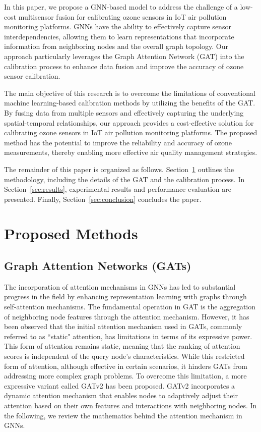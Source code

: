 \documentclass[conference,a4paper]{IEEEtran}
\begin{document}
In this paper, we propose a GNN-based model to address the challenge of a low-cost multisensor fusion for calibrating ozone sensors in IoT air pollution monitoring platforms. GNNs have the ability to effectively capture sensor interdependencies, allowing them to learn representations that incorporate information from neighboring nodes and the overall graph topology. Our approach particularly leverages the Graph Attention Network (GAT)\cite{veličković2018graph} into the calibration process to enhance data fusion and improve the accuracy of ozone sensor calibration.

The main objective of this research is to overcome the limitations of conventional machine learning-based calibration methods by utilizing the benefits of the GAT. By fusing data from multiple sensors and effectively capturing the underlying spatial-temporal relationships, our approach provides  a cost-effective solution for calibrating ozone sensors in IoT air pollution monitoring platforms. The proposed method has the potential to improve the reliability and accuracy of ozone measurements, thereby enabling more effective air quality management strategies.

The remainder of this paper is organized as follows. Section~\ref{sec:method} outlines the methodology, including the details of the GAT and the calibration process. In Section~\ref{sec:results}, experimental results and performance evaluation are presented. Finally, Section~\ref{sec:conclusion} concludes the paper.

\section{Proposed Methods}
\label{sec:method}

\subsection{Graph Attention Networks (GATs)}
The incorporation of attention mechanisms in GNNs has led to substantial progress in the field by enhancing representation learning with graphs through self-attention mechanisms. The fundamental operation in GAT is the aggregation of neighboring node features through the attention mechanism\cite{veličković2018graph}. However, it has been observed that the initial attention mechanism used in GATs, commonly referred to as ``static" attention, has limitations in terms of its expressive power. This form of attention remains static,  meaning that the ranking of attention scores is independent of the query node's characteristics. While this restricted form of attention, although effective in certain scenarios, it hinders GATs from addressing more complex graph problems. To overcome this limitation, a more expressive variant called GATv2 has been proposed\cite{brody2022how}. GATv2 incorporates a dynamic attention mechanism that enables nodes to adaptively adjust their attention based on their own features and interactions with neighboring nodes. In the following, we review the mathematics behind the attention mechanism in GNNs. 
\end{document}
